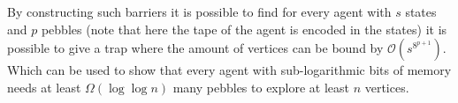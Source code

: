 \documentclass[draft,oneside]{scrartcl}
\begin{document}
By constructing such barriers it is possible to find for every agent
with $s$ states and $p$ pebbles (note that here the tape of the agent is
encoded in the states) it is possible to give a trap where the amount of
vertices can be bound by $\mathcal{O}(s^{8^{p+1}})$. Which can be used to
show that every agent with sub-logarithmic bits of memory needs at least
$\Omega(\log\log n)$ many pebbles to explore at least $n$ vertices.

\printbibliography
\end{document}
